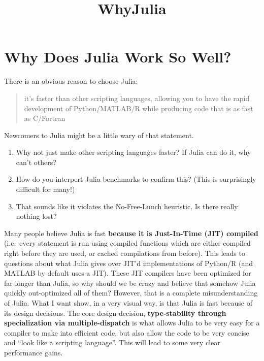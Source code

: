 \documentclass[11pt]{article}
\title{WhyJulia}
\begin{document}
    
    
    \maketitle
    
    

    
    \section{Why Does Julia Work So
Well?}\label{why-does-julia-work-so-well}

There is an obvious reason to choose Julia:

\begin{quote}
it's faster than other scripting languages, allowing you to have the
rapid development of Python/MATLAB/R while producing code that is as
fast as C/Fortran
\end{quote}

Newcomers to Julia might be a little wary of that statement.

\begin{enumerate}
\def\labelenumi{\arabic{enumi}.}
\itemsep1pt\parskip0pt
\item
  Why not just make other scripting languages faster? If Julia can do
  it, why can't others?
\item
  How do you interpert Julia benchmarks to confirm this? (This is
  surprisingly difficult for many!)
\item
  That sounds like it violates the No-Free-Lunch heuristic. Is there
  really nothing lost?
\end{enumerate}

Many people believe Julia is fast \textbf{because it is Just-In-Time
(JIT) compiled} (i.e.~every statement is run using compiled functions
which are either compiled right before they are used, or cached
compilations from before). This leads to questions about what Julia
gives over JIT'd implementations of Python/R (and MATLAB by default uses
a JIT). These JIT compilers have been optimized for far longer than
Julia, so why should we be crazy and believe that somehow Julia quickly
out-optimized all of them? However, that is a complete misunderstanding
of Julia. What I want show, in a very visual way, is that Julia is fast
because of its design decisions. The core design decision,
\textbf{type-stability through specialization via multiple-dispatch} is
what allows Julia to be very easy for a compiler to make into efficient
code, but also allow the code to be very concise and ``look like a
scripting language''. This will lead to some very clear performance
gains.
\end{document}
